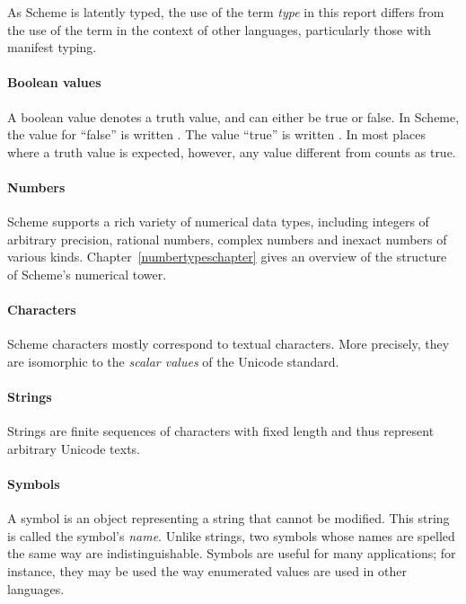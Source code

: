 \begin{note}
  As Scheme is latently typed, the use of the term \textit{type} in
  this report differs from the use of the term in the context of other
  languages, particularly those with manifest typing.
\end{note}

\paragraph{Boolean values}

A boolean value denotes a truth value, and can either be
true or false.  In Scheme, the value for ``false'' is written
\schfalse{}.  The value ``true'' is written \schtrue{}.  In
most places where a truth value is expected, however, any value different from
\schfalse{} counts as true.

\paragraph{Numbers}

Scheme supports a rich variety of numerical data types, including
integers of arbitrary precision, rational numbers, complex numbers and
inexact numbers of various kinds.  Chapter~\ref{numbertypeschapter} gives an
overview of the structure of Scheme's numerical tower.

\paragraph{Characters}

Scheme characters mostly correspond to textual characters.
More precisely, they are isomorphic to the \textit{scalar values} of
the Unicode standard.

\paragraph{Strings}

Strings are finite sequences of characters with fixed length and thus
represent arbitrary Unicode texts.

\paragraph{Symbols}

A symbol is an object representing a string that
cannot be modified.  This string is called the symbol's \textit{name}.
Unlike strings, two symbols whose names are spelled the same
way are indistinguishable.  Symbols are useful for many applications;
for instance, they may be used the way enumerated values are used in
other languages.

